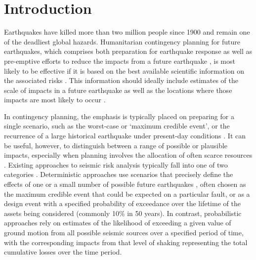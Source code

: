 \documentclass[preprint,12pt,authoryear]{elsarticle}
\begin{document}
\section{Introduction}
Earthquakes have killed more than two million people since 1900 \citep{England2011,Daniell2017} and remain one of the deadliest global hazards. Humanitarian contingency planning for future earthquakes, which comprises both preparation for earthquake response as well as pre-emptive efforts to reduce the impacts from a future earthquake \citep{IASC2007,IFRC2012}, is most likely to be effective if it is based on the best available scientific information on the associated risks \citep{Alexander2007}. This information should ideally include estimates of the scale of impacts in a future earthquake as well as the locations where those impacts are most likely to occur \citep{IASC2007}.

In contingency planning, the emphasis is typically placed on preparing for a single scenario, such as the worst-case or `maximum credible event', or the recurrence of a large historical earthquake under present-day conditions \citep[e.g.,][]{klugel_seismic_2008}. It can be useful, however, to distinguish between a range of possible or plausible impacts, especially when planning involves the allocation of often scarce resources \citep{Robinson2018}. Existing approaches to seismic risk analysis typically fall into one of two categories \citep{Robinson2018, mcguire_deterministic_2001}. Deterministic approaches use scenarios that precisely define the effects of one or a small number of possible future earthquakes \citep{Davies2015}, often chosen as the maximum credible event that could be expected on a particular fault, or as a design event with a specified probability of exceedance over the lifetime of the assets being considered (commonly 10\% in 50 years). In contrast, probabilistic approaches rely on estimates of the likelihood of exceeding a given value of ground motion from all possible seismic sources over a specified period of time, with the corresponding impacts from that level of shaking representing the total cumulative losses over the time period.
\end{document}
